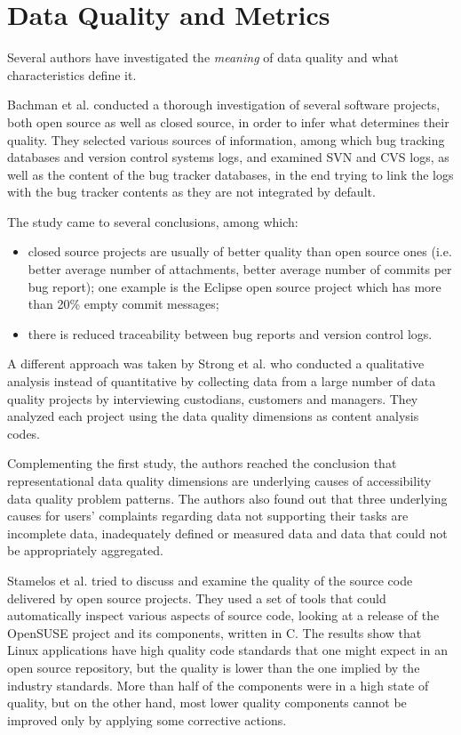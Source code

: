 \documentclass[11pt,english,twocolumn]{article}
\begin{document}
\section{Data Quality and Metrics}
\label{sec:data-quality}

Several authors have investigated the \emph{meaning} of data quality and
what characteristics define it.

Bachman et al. \cite{bachmann2009software} conducted a thorough investigation of several
software projects, both open source as well as closed source, in order 
to infer what determines their quality. They selected 
various sources of information, among which bug tracking 
databases and version control systems logs, and examined SVN and CVS logs,
as well as the content of the bug tracker databases, in the end trying to link 
the logs with the bug tracker contents as they are not integrated by default. 

The study came to several conclusions, among which:
  \begin{itemize}
    \item closed source projects are usually of better quality than open source ones
    (i.e. better average number of attachments, better average number of commits per bug report); 
    one example is the Eclipse open source project which has more than 20\% empty commit messages;
    \item there is reduced traceability between bug reports and version control logs.
  \end{itemize}

A different approach was taken by Strong et al. \cite{strong1997data} who conducted a qualitative analysis
instead of quantitative by collecting data from a large number of data quality projects by 
interviewing custodians, customers and managers. They analyzed each project
using the data quality dimensions as content analysis codes.

Complementing the first study, the authors reached the conclusion that representational data 
quality dimensions are underlying causes of accessibility data quality problem
patterns. The authors also found out that three underlying causes for users'
complaints regarding data not supporting their tasks are incomplete data, 
inadequately defined or measured data and data that could not be appropriately
aggregated.

Stamelos et al. \cite{stamelos2002code} tried to discuss and examine the quality
of the source code delivered by open source projects. They used a set of tools
that could automatically inspect various aspects of source code, looking at
a release of the OpenSUSE project and its components, written in C.
The results show that Linux applications have high quality 
code standards that one might expect in an open source repository, but 
the quality is lower than the one implied by the industry standards. More than half
of the components were in a high state of quality, but on the other hand, 
most lower quality components cannot be improved only by applying some
corrective actions. 
\end{document}
